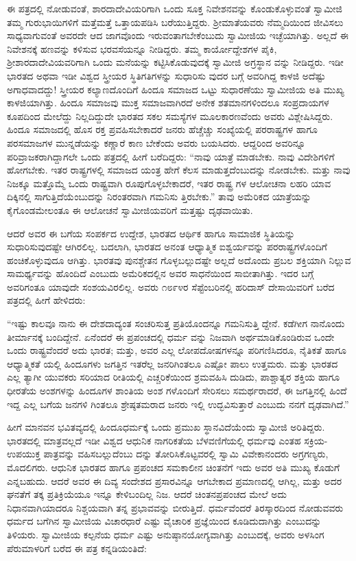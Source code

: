 ಈ ಪತ್ರದಲ್ಲಿ ನೋಡುವಂತೆ, ಶಾರದಾದೇವಿಯರಿಗಾಗಿ ಒಂದು ಸೂಕ್ತ ನಿವೇಶನವನ್ನು ಕೊಂಡುಕೊಳ್ಳುವಂತೆ ಸ್ವಾಮೀಜಿ ತಮ್ಮ ಗುರುಭಾಯಿಗಳಿಗೆ ಮತ್ತೆಮತ್ತೆ ಒತ್ತಾಯಪಡಿಸಿ ಬರೆಯುತ್ತಿದ್ದರು. ಶ್ರೀಮಾತೆಯವರು ನೆಮ್ಮದಿಯಿಂದ ಜೀವಿಸಲು ಸಾಧ್ಯವಾಗುವಂತೆ ಅವರದೇ ಆದ ಜಾಗವೊಂದು ಇರುವಂತಾಗಬೇಕೆಂಬುದು ಸ್ವಾಮೀಜಿಯ ಇಚ್ಛೆಯಾಗಿತ್ತು. ಅಲ್ಲದೆ ಈ ನಿವೇಶನಕ್ಕೆ ಹಣವನ್ನು ಕಳಿಸುವ ಭರವಸೆಯನ್ನೂ ನೀಡಿದ್ದರು. ತಮ್ಮ ಕಾರ್ಯೋದ್ದೇಶಗಳ ಪೈಕಿ, ಶ್ರೀಶಾರದಾದೇವಿಯವರಿಗಾಗಿ ಒಂದು ಮನೆಯನ್ನು ಕಟ್ಟಿಸಿಕೊಡುವುದಕ್ಕೆ ಸ್ವಾಮೀಜಿ ಅಗ್ರಸ್ಥಾನ ವನ್ನು ನೀಡಿದ್ದರು. ಇಡೀ ಭಾರತದ ಅಥವಾ ಇಡೀ ವಿಶ್ವದ ಸ್ತ್ರೀಯರ ಸ್ಥಿತಿಗತಿಗಳನ್ನು ಸುಧಾರಿಸು ವುದರ ಬಗ್ಗೆ ಅವರಿಗಿದ್ದ ಕಾಳಜಿ ಅದೆಷ್ಟು ಅಗಾಧವಾದದ್ದು! ಸ್ತ್ರೀಯರ ಕಲ್ಯಾಣದೊಂದಿಗೆ ಹಿಂದೂ ಸಮಾಜದ ಒಟ್ಟು ಸುಧಾರಣೆಯು ಸ್ವಾಮೀಜಿಯ ಅತಿ ಮುಖ್ಯ ಕಾಳಜಿಯಾಗಿತ್ತು. ಹಿಂದೂ ಸಮಾಜವು ಮುಕ್ತ ಸಮಾಜವಾಗಿರದೆ ಅನೇಕ ಶತಮಾನಗಳಿಂದಲೂ ಸಂಪ್ರದಾಯಗಳ ಕೂಪದಿಂದ ಮೇಲೆದ್ದು ನಿಲ್ಲದಿದ್ದುದೇ ಭಾರತದ ಸಕಲ ಸಮಸ್ಯೆಗಳ ಮೂಲಕಾರಣವೆಂದು ಅವರು ವಿಶ್ಲೇಷಿಸಿದ್ದರು. ಹಿಂದೂ ಸಮಾಜದಲ್ಲಿ ಹೊಸ ರಕ್ತ ಪ್ರವಹಿಸಬೇಕಾದರೆ ಜನರು ಹೆಚ್ಚೆಚ್ಚು ಸಂಖ್ಯೆಯಲ್ಲಿ ಪರರಾಷ್ಟ್ರಗಳ ಹಾಗೂ ಪರಸಮಾಜಗಳ ಮುನ್ನಡೆಯನ್ನು ಕಣ್ಣಾರೆ ಕಾಣ ಬೇಕೆಂದು ಅವರು ಬಯಸಿದರು. ಆದ್ದರಿಂದ ಅವರಿನ್ನೂ ಪರಿವ್ರಾಜಕರಾಗಿದ್ದಾಗಲೇ ಒಂದು ಪತ್ರದಲ್ಲಿ ಹೀಗೆ ಬರೆದಿದ್ದರು: “ನಾವು ಯಾತ್ರೆ ಮಾಡಬೇಕು. ನಾವು ವಿದೇಶಿಗಳಿಗೆ ಹೋಗಬೇಕು. ಇತರ ರಾಷ್ಟ್ರಗಳಲ್ಲಿ ಸಮಾಜದ ಯಂತ್ರ ಹೇಗೆ ಕೆಲಸ ಮಾಡುತ್ತದೆಂಬುದನ್ನು ನೋಡಬೇಕು. ಮತ್ತು ನಾವು ನಿಜಕ್ಕೂ ಮತ್ತೊಮ್ಮೆ ಒಂದು ರಾಷ್ಟ್ರವಾಗಿ ರೂಪುಗೊಳ್ಳಬೇಕಾದರೆ, ಇತರ ರಾಷ್ಟ್ರ ಗಳ ಆಲೋಚನಾ ಲಹರಿ ಯಾವ ದಿಕ್ಕಿನಲ್ಲಿ ಸಾಗುತ್ತಿದೆಯೆಂಬುದನ್ನು ನಿರಂತರವಾಗಿ ಗಮನಿಸು ತ್ತಿರಬೇಕು.” ತಾವು ಅಮೆರಿಕದ ಯಾತ್ರೆಯನ್ನು ಕೈಗೊಂಡಮೇಲಂತೂ ಈ ಆಲೋಚನೆ ಸ್ವಾಮೀಜಿಯವರಿಗೆ ಮತ್ತಷ್ಟು ದೃಢವಾಯಿತು.

ಆದರೆ ಅವರ ಈ ಬಗೆಯ ಸಂಪರ್ಕದ ಉದ್ದೇಶ, ಭಾರತದ ಆರ್ಥಿಕ ಹಾಗೂ ಸಾಮಾಜಿಕ ಸ್ಥಿತಿಯನ್ನು ಸುಧಾರಿಸುವುದಷ್ಟೇ ಆಗಿರಲಿಲ್ಲ. ಬದಲಾಗಿ, ಭಾರತದ ಅನಂತ ಆಧ್ಯಾತ್ಮಿಕ ಐಶ್ವರ್ಯವನ್ನು ಪರರಾಷ್ಟ್ರಗಳೊಂದಿಗೆ ಹಂಚಿಕೊಳ್ಳುವುದೂ ಆಗಿತ್ತು. ಭಾರತವು ಪುನಶ್ಚೇತನ ಗೊಳ್ಳಬಲ್ಲುದಷ್ಟೇ ಅಲ್ಲದೆ ಅದೊಂದು ಪ್ರಬಲ ಶಕ್ತಿಯಾಗಿ ನಿಲ್ಲುವ ಸಾಮರ್ಥ್ಯವನ್ನು ಹೊಂದಿದೆ ಎಂಬುದು ಅಮೆರಿಕದಲ್ಲಿನ ಅವರ ಸಾಧನೆಯಿಂದ ಸಾಬೀತಾಗಿತ್ತು. ಇದರ ಬಗ್ಗೆ ಅವರಿಗಂತೂ ಯಾವುದೇ ಸಂಶಯವಿರಲಿಲ್ಲ. ಅವರು ೧೮೯೪ರ ಸೆಪ್ಟೆಂಬರಿನಲ್ಲಿ ಹರಿದಾಸ್ ದೇಸಾಯಿವರಿಗೆ ಬರೆದ ಪತ್ರದಲ್ಲಿ ಹೀಗೆ ಹೇಳಿದರು:

“ಇಷ್ಟು ಕಾಲವೂ ನಾನು ಈ ದೇಶದಾದ್ಯಂತ ಸಂಚರಿಸುತ್ತ ಪ್ರತಿಯೊಂದನ್ನೂ ಗಮನಿಸುತ್ತಿ ದ್ದೇನೆ. ಕಡೆಗೀಗ ನಾನೊಂದು ತೀರ್ಮಾನಕ್ಕೆ ಬಂದಿದ್ದೇನೆ. ಏನೆಂದರೆ ಈ ಪ್ರಪಂಚದಲ್ಲಿ ಧರ್ಮ ವನ್ನು ನಿಜವಾಗಿ ಅರ್ಥಮಾಡಿಕೊಂಡಿರುವ ಒಂದೇ ಒಂದು ರಾಷ್ಟ್ರವೆಂದರೆ ಅದು ಭಾರತ; ಮತ್ತು, ಅವರ ಎಲ್ಲ ಲೋಪದೋಷಗಳನ್ನೂ ಪರಿಗಣಿಸಿದರೂ, ನೈತಿಕತೆ ಹಾಗೂ ಆಧ್ಯಾತ್ಮಿಕತೆ ಯಲ್ಲಿ ಹಿಂದೂಗಳು ಜಗತ್ತಿನ ಇತರೆಲ್ಲ ಜನರಿಗಿಂತಲೂ ಎಷ್ಟೋ ಪಾಲು ಉತ್ತಮರು. ಮತ್ತು ಭಾರತದ ಎಲ್ಲ ತ್ಯಾಗೀ ಯುವಕರು ಸರಿಯಾದ ರೀತಿಯಲ್ಲಿ ಎಚ್ಚರಿಕೆಯಿಂದ ಶ್ರಮವಹಿಸಿ ದುಡಿದು, ಪಾಶ್ಚಾತ್ಯರ ಶಕ್ತಿಯ ಹಾಗೂ ಧೀರತೆಯ ಅಂಶಗಳನ್ನು ಹಿಂದೂಗಳ ಶಾಂತಿಯ ಅಂಶ ಗಳೊಂದಿಗೆ ಸೇರಿಸಲು ಸಮರ್ಥರಾದರೆ, ಈ ಜಗತ್ತಿನಲ್ಲಿ ಹಿಂದೆ ಇದ್ದ ಎಲ್ಲ ಬಗೆಯ ಜನಗಳಿ ಗಿಂತಲೂ ಶ್ರೇಷ್ಠತಮರಾದ ಜನರು ಇಲ್ಲಿ ಉದ್ಭವಿಸುತ್ತಾರೆ ಎಂಬುದು ನನಗೆ ದೃಢವಾಗಿದೆ.”

ಹೀಗೆ ಮಾನವನ ಭವಿತವ್ಯದಲ್ಲಿ ಹಿಂದೂಧರ್ಮಕ್ಕೆ ಒಂದು ಪ್ರಮುಖ ಸ್ಥಾನವಿದೆಯೆಂದು ಸ್ವಾಮೀಜಿ ಅರಿತಿದ್ದರು. ಭಾರತದಲ್ಲಿ ಮಾತ್ರವಲ್ಲದೆ ಇಡೀ ವಿಶ್ವದ ಆಧುನಿಕ ನಾಗರಿಕತೆಯ ಬೆಳವಣಿಗೆಯಲ್ಲಿ ಧರ್ಮವು ಎಂತಹ ಸಕ್ರಿಯ-ಉಪಯುಕ್ತ ಪಾತ್ರವನ್ನು ವಹಿಸಬಲ್ಲುದೆಂಬು ದನ್ನು ತೋರಿಸಿಕೊಟ್ಟವರಲ್ಲಿ ಸ್ವಾಮಿ ವಿವೇಕಾನಂದರು ಅಗ್ರಗಣ್ಯರು, ಮೊದಲಿಗರು. ಆಧುನಿಕ ಭಾರತದ ಹಾಗೂ ಪ್ರಪಂಚದ ಸಮಕಾಲೀನ ಚಿಂತನೆಗೆ ಇದು ಅವರ ಅತಿ ಮುಖ್ಯ ಕೊಡುಗೆ ಎನ್ನಬಹುದು. ಆದರೆ ಅವರ ಈ ದಿವ್ಯ ಸಂದೇಶದ ಪ್ರಸಾರವಿನ್ನೂ ಆಗಬೇಕಾದ ಪ್ರಮಾಣದಲ್ಲಿ ಆಗಿಲ್ಲ, ಮತ್ತು ಅದರ ಘನತೆಗೆ ತಕ್ಕ ಪ್ರತಿಕ್ರಿಯೆಯೂ ಇನ್ನೂ ಕೇಳಿಬಂದಿಲ್ಲ ನಿಜ. ಆದರೆ ಚಿಂತನಪ್ರಪಂಚದ ಮೇಲೆ ಅದು ನಿಧಾನವಾಗಿಯಾದರೂ ನಿಶ್ಚಯವಾಗಿ ತನ್ನ ಪ್ರಭಾವವನ್ನು ಬೀರುತ್ತಿದೆ. ಧರ್ಮವೆಂದರೆ ತಿರಸ್ಕಾರದಿಂದ ನೋಡುವವರು ಧರ್ಮದ ಬಗೆಗಿನ ಸ್ವಾಮೀಜಿಯ ವಿಚಾರಧಾರೆ ಎಷ್ಟು ವೈಚಾರಿಕ ಪ್ರಜ್ಞೆಯಿಂದ ಕೂಡಿದುದಾಗಿತ್ತು ಎಂಬುದನ್ನು ತಿಳಿಯರು. ಸ್ವಾಮೀಜಿಯ ಕಲ್ಪನೆಯ ಧರ್ಮ ಎಷ್ಟು ಅನುಷ್ಠಾನಯೋಗ್ಯವಾಗಿತ್ತು ಎಂಬುದಕ್ಕೆ, ಅವರು ಅಳಸಿಂಗ ಪೆರುಮಾಳರಿಗೆ ಬರೆದ ಈ ಪತ್ರ ಕನ್ನಡಿಯಂತಿದೆ:

